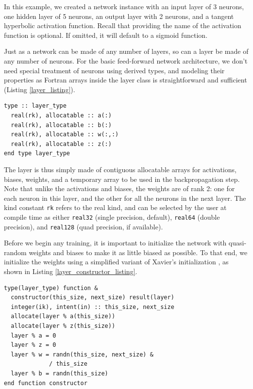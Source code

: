 \documentclass[sigplan, review=false, screen=true, balance=true]{acmart}
\begin{document}
In this example, we created a network instance with an input layer of 3 neurons,
one hidden layer of 5 neurons, an output layer with 2 neurons, and a tangent
hyperbolic activation function. Recall that providing the name of the activation
function is optional. If omitted, it will default to a sigmoid function.

Just as a network can be made of any number of layers, so can a layer be made
of any number of neurons. For the basic feed-forward network architecture,
we don't need special treatment of neurons using derived types, and modeling
their properties as Fortran arrays inside the layer class is straightforward
and sufficient (Listing \ref{layer_listing}).

\begin{minipage}{\linewidth}
\begin{lstlisting}[caption={Definition of the layer class.}, captionpos=b, label={layer_listing}]
type :: layer_type
  real(rk), allocatable :: a(:)
  real(rk), allocatable :: b(:)
  real(rk), allocatable :: w(:,:)
  real(rk), allocatable :: z(:)
end type layer_type
\end{lstlisting}
\end{minipage}

The layer is thus simply made of contiguous allocatable arrays for activations,
biases, weights, and a temporary array to be used in the backpropagation step.
Note that unlike the activations and biases, the weights are of rank 2: one for
each neuron in this layer, and the other for all the neurons in the next layer.
The kind constant \lstinline{rk} refers to the real kind, and can be selected
by the user at compile time as either \lstinline{real32} (single precision,
default), \lstinline{real64} (double precision), and \lstinline{real128}
(quad precision, if available).

Before we begin any training, it is important to initialize the network with
quasi-random weights and biases to make it as little biased as possible.
To that end, we initialize the weights using a simplified variant of Xavier's
initialization \citep{glorot10}, as shown in Listing \ref{layer_constructor_listing}.

\begin{minipage}{\linewidth}
\begin{lstlisting}[caption={Layer constructor.}, captionpos=b, label={layer_constructor_listing}]
type(layer_type) function &
  constructor(this_size, next_size) result(layer)
  integer(ik), intent(in) :: this_size, next_size
  allocate(layer % a(this_size))
  allocate(layer % z(this_size))
  layer % a = 0
  layer % z = 0
  layer % w = randn(this_size, next_size) &
             / this_size
  layer % b = randn(this_size)
end function constructor
\end{lstlisting}
\end{minipage}
\end{document}
